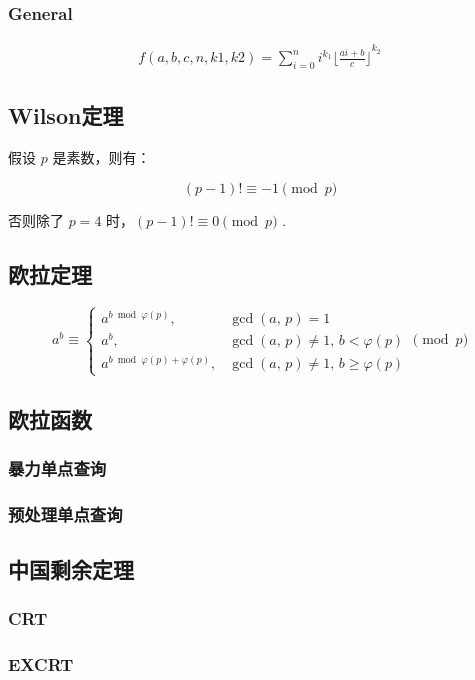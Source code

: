 \documentclass{article}
\begin{document}
\subsubsection{General}
$$
\begin{aligned}
f(a,b,c,n,k1,k2)=\sum_{i=0}^{n}i^{k_1}{\lfloor \frac{ai+b}{c} \rfloor}^{k_2}
\end{aligned}
$$


\subsection{Wilson定理}
假设 $p$ 是素数，则有：

$$
(p-1)! \equiv -1 \pmod{p}
$$

否则除了 $p=4$ 时，$(p-1)!\equiv 0 \pmod{p}$ .

\subsection{欧拉定理}

$$
a^b\equiv
\begin{cases}
a^{b\bmod\varphi(p)},\,&\gcd(a,\,p)=1\\
a^b,&\gcd(a,\,p)\ne1,\,b<\varphi(p)\\
a^{b\bmod\varphi(p)+\varphi(p)},&\gcd(a,\,p)\ne1,\,b\ge\varphi(p)
\end{cases}
\pmod p
$$

\subsection{欧拉函数}
\subsubsection{暴力单点查询}

\subsubsection{预处理单点查询}

\subsection{中国剩余定理}
\subsubsection{CRT}

\subsubsection{EXCRT}

\end{document}
